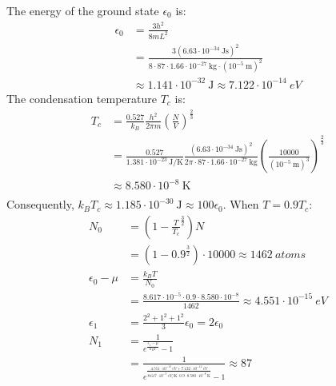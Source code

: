 \documentclass{article}
\begin{document}
The energy of the ground state $\epsilon_0$ is:
\begin{equation}
    \begin{split}
        \epsilon_0 & = \frac{3h^2}{8mL^2} \\
        & = \frac{3{\left(6.63 \cdot 10^{-34}~\unit{\joule\second}\right)}^2}{8 \cdot 87 \cdot 1.66 \cdot 10^{-27}~\unit{\kilo\gram} \cdot {\left(10^{-5}~\unit{\meter}\right)}^2} \\
        & \approx 1.141 \cdot 10^{-32}~\unit{\joule} \approx 7.122 \cdot 10^{-14}~\unit{eV}
    \end{split}
\end{equation}
The condensation temperature $T_c$ is:
\begin{equation}
    \begin{split}
        T_c & = \frac{0.527}{k_B}\frac{h^2}{2\pi m}{\left(\frac{N}{V}\right)}^{\frac{2}{3}} \\
        & = \frac{0.527}{1.381 \cdot 10^{-23}~\unit{\joule\per\kelvin}}\frac{{\left(6.63 \cdot 10^{-34}~\unit{\joule\second}\right)}^2}{2\pi \cdot 87 \cdot 1.66 \cdot 10^{-27}~\unit{\kilo\gram}}{\left(\frac{10000}{{\left(10^{-5}~\unit{\meter}\right)}^3}\right)}^{\frac{2}{3}} \\
        & \approx 8.580 \cdot 10^{-8}~\unit{\kelvin} \\
    \end{split}
\end{equation}
Consequently, $k_BT_c \approx 1.185 \cdot 10^{-30}~\unit{\joule} \approx 100\epsilon_0$.
When $T = 0.9T_c$:
\begin{equation}
    \begin{split}
        N_0 & = \left(1 - \frac{T}{T_c}^{\frac{3}{2}}\right)N \\
        & = \left(1 - 0.9^{\frac{3}{2}}\right) \cdot 10000 \approx 1462~\unit{atoms} \\
        \epsilon_0 - \mu & = \frac{k_BT}{N_0} \\
        & = \frac{8.617 \cdot 10^{-5} \cdot 0.9 \cdot 8.580 \cdot 10^{-8}}{1462} \approx 4.551 \cdot 10^{-15}~\unit{eV} \\
        \epsilon_1 & = \frac{2^2 + 1^2 + 1^2}{3}\epsilon_0 = 2\epsilon_0 \\
        N_1 & = \frac{1}{e^{\frac{\epsilon_1 - \mu}{k_BT}} - 1} \\
        & = \frac{1}{e^{\frac{4.551 \cdot 10^{-15}~\unit{eV} + 7.122 \cdot 10^{-14}~\unit{eV}}{8.617 \cdot 10^{-5}~\unit{eV\per\kelvin} \cdot 0.9 \cdot 8.580 \cdot 10^{-8}~\unit{\kelvin} }} - 1} \approx 87
    \end{split}
\end{equation}
\end{document}
